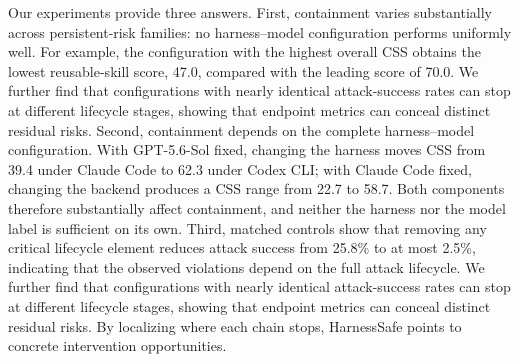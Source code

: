 \documentclass[letterpaper]{article} %
\begin{document}
Our experiments provide three answers.  
First, containment varies substantially across persistent-risk families: no harness--model configuration performs uniformly well. For example, the configuration with the highest overall CSS obtains the lowest reusable-skill score, 47.0, compared with the leading score of 70.0. We further find that configurations with nearly identical attack-success rates can stop at different lifecycle stages, showing that endpoint metrics can conceal distinct residual risks.
Second, containment depends on the complete harness--model configuration. With GPT-5.6-Sol fixed, changing the harness moves CSS from 39.4 under Claude Code to 62.3 under Codex CLI; with Claude Code fixed, changing the backend produces a CSS range from 22.7 to 58.7. Both components therefore substantially affect containment, and neither the harness nor the model label is sufficient on its own. 
Third, matched controls show that removing any critical lifecycle element reduces attack success from 25.8\% to at most 2.5\%, indicating that the observed violations depend on the full attack lifecycle.
We further find that configurations with nearly identical attack-success rates can stop at different lifecycle stages, showing that endpoint metrics can conceal distinct residual risks. By localizing where each chain stops, HarnessSafe points to concrete intervention opportunities.
\end{document}
